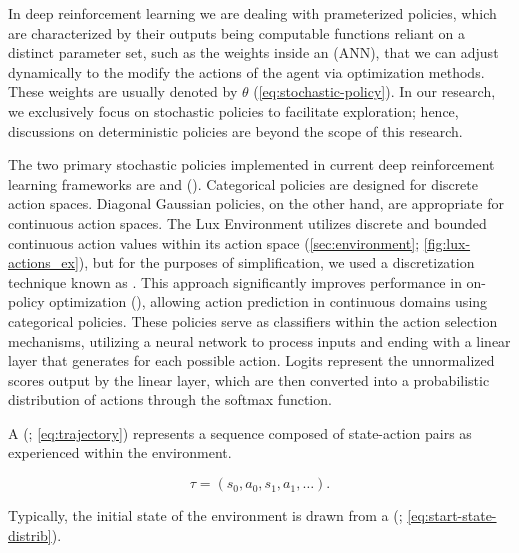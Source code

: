 \noindent In deep reinforcement learning we are dealing with prameterized policies, which are characterized by their outputs being computable functions reliant on a distinct parameter set, such as the weights inside an  (ANN), that we can adjust dynamically to the modify the actions of the agent via optimization methods. These weights are usually denoted by $\theta$ (\textcolor{deepblue}{\autoref{eq:stochastic-policy}}). In our research, we exclusively focus on stochastic policies to facilitate exploration; hence, discussions on deterministic policies are beyond the scope of this research.

\bigskip

\noindent The two primary stochastic policies implemented in current deep reinforcement learning frameworks are  and  (\textcolor{deepblue}{\cite{SpinningUp2018}}). Categorical policies are designed for discrete action spaces. Diagonal Gaussian policies, on the other hand, are appropriate for continuous action spaces. The Lux Environment utilizes discrete and bounded continuous action values within its action space (\autoref{sec:environment}; \autoref{fig:lux-actions_ex}), but for the purposes of simplification, we used a discretization technique known as . This approach significantly improves performance in on-policy optimization (\textcolor{deepblue}{\cite{tang2020discretizing}}), allowing action prediction in continuous domains using categorical policies. These policies serve as classifiers within the action selection mechanisms, utilizing a neural network to process inputs and ending with a linear layer that generates  for each possible action. Logits represent the unnormalized scores output by the linear layer, which are then converted into a probabilistic distribution of actions through the softmax function.

\bigskip

\noindent A  (\textcolor{deepblue}{\cite{Sutton1998}; \autoref{eq:trajectory}}) represents a sequence composed of state-action pairs as experienced within the environment.

\begin{equation}
    \tau = (s_0, a_0, s_1, a_1, \hdots).
    \label{eq:trajectory}
\end{equation}

\noindent Typically, the initial state of the environment is drawn from a  (\textcolor{deepblue}{\cite{Sutton1998}; \autoref{eq:start-state-distrib}}).

